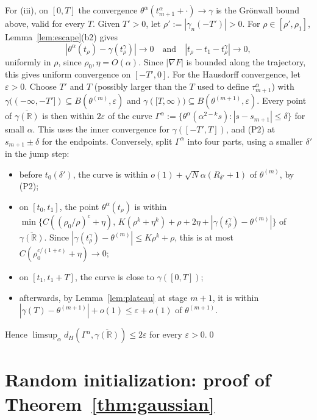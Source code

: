 \documentclass[11pt]{article}
\theoremstyle{definition}
\theoremstyle{remark}
\numberwithin{equation}{section}
\newcommand{\R}{\mathbb{R}}
\newcommand{\eps}{\varepsilon}
\begin{document}
For (iii), on $[0,T]$ the convergence $\theta^\alpha(t^\alpha_{m+1}+\cdot)\to\gamma$ is the Grönwall bound above, valid for every $T$. Given $T'>0$, let $\rho':=|\gamma_n(-T')|>0$. For $\rho\in[\rho',\rho_1]$, Lemma~\ref{lem:escape}(b2) gives
\[
|\theta^\alpha(t_\rho)-\gamma(t^\gamma_\rho)|\to0\quad\text{and}\quad|t_\rho-t_1-t^\gamma_\rho|\to0,
\]
uniformly in $\rho$, since $\rho_0,\eta=O(\alpha)$. Since $|\nabla F|$ is bounded along the trajectory, this gives uniform convergence on $[-T',0]$. For the Hausdorff convergence, let $\eps>0$. Choose $T'$ and $T$ (possibly larger than the $T$ used to define $\tau^\alpha_{m+1}$) with $\gamma((-\infty,-T'])\subseteq B(\theta^{(m)},\eps)$ and $\gamma([T,\infty))\subseteq B(\theta^{(m+1)},\eps)$. Every point of $\overline{\gamma(\R)}$ is then within $2\eps$ of the curve $\Gamma^\alpha:=\{\theta^\alpha(\alpha^{2-k}s):|s-s_{m+1}|\le\delta\}$ for small $\alpha$. This uses the inner convergence for $\gamma([-T',T])$, and (P2) at $s_{m+1}\pm\delta$ for the endpoints. Conversely, split $\Gamma^\alpha$ into four parts, using a smaller $\delta'$ in the jump step:
\begin{itemize}
\item before $t_0(\delta')$, the curve is within $o(1)+\sqrt N\alpha(R_{\delta'}+1)$ of $\theta^{(m)}$, by (P2);
\item on $[t_0,t_1]$, the point $\theta^\alpha(t_\rho)$ is within $\min\{C((\rho_0/\rho)^c+\eta),\,K(\rho^k+\eta^k)+\rho+2\eta+|\gamma(t^\gamma_\rho)-\theta^{(m)}|\}$ of $\overline{\gamma(\R)}$. Since $|\gamma(t^\gamma_\rho)-\theta^{(m)}|\le K\rho^k+\rho$, this is at most $C(\rho_0^{c/(1+c)}+\eta)\to0$;
\item on $[t_1,t_1+T]$, the curve is close to $\gamma([0,T])$;
\item afterwards, by Lemma~\ref{lem:plateau} at stage $m+1$, it is within $|\gamma(T)-\theta^{(m+1)}|+o(1)\le\eps+o(1)$ of $\theta^{(m+1)}$.
\end{itemize}
Hence $\limsup_\alpha d_H(\Gamma^\alpha,\overline{\gamma(\R)})\le2\eps$ for every $\eps>0$.\qed

\section{Random initialization: proof of Theorem~\ref{thm:gaussian}}\label{sec:proof-gaussian}
\end{document}
